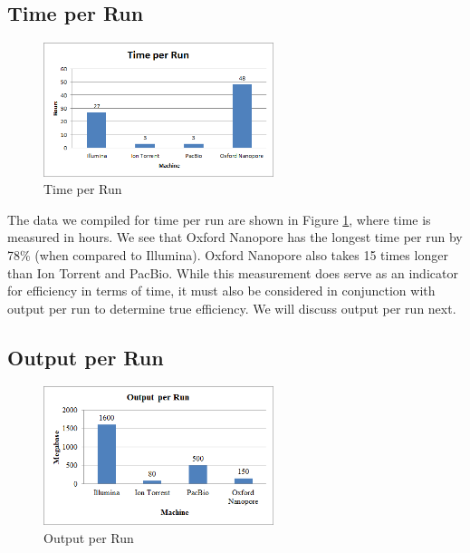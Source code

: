 \documentclass[12pt,letterpaper]{report}
\begin{document}
\subsection{Time per Run}

\begin{figure}
  \vspace{-20pt}
  \begin{center}
    \includegraphics[width=0.6\textwidth]{time_per_run.png}
  \end{center}
  \vspace{-20pt}
  \caption[Time per Run]{Time per Run \protect\cite{Quick,van_Dijk}}
  \vspace{-10pt}
  \label{fig:time_per_run}
\end{figure}

The data we compiled for time per run are shown in Figure \ref{fig:time_per_run}, where time is measured in hours. We see that Oxford Nanopore has the longest time per run by 78\% (when compared to Illumina). Oxford Nanopore also takes 15 times longer than Ion Torrent and PacBio. While this measurement does serve as an indicator for efficiency in terms of time, it must also be considered in conjunction with output per run to determine true efficiency. We will discuss output per run next. 

\subsection{Output per Run}

\begin{figure}
\vspace{-20pt}
  \begin{center}
    \includegraphics[width=0.6\textwidth]{output_per_run.png}
  \end{center}
  \vspace{-20pt}
  \caption[Output per Run]{Output per Run \protect\cite{Quick,van_Dijk,Loman,Mikheyev}}
  \vspace{-10pt}
  \label{fig:output_per_run}
\end{figure}
\end{document}
